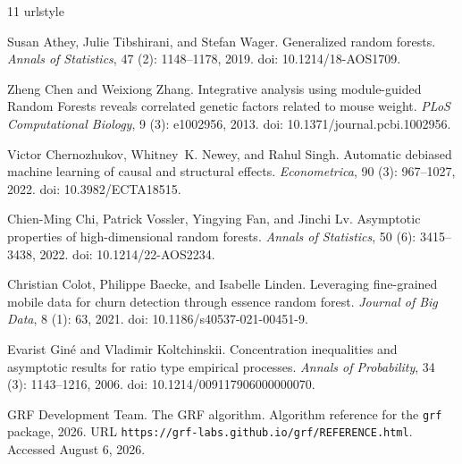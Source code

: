 \documentclass[12pt]{article}
\begin{document}
\begingroup
\small

\begin{thebibliography}{11}
\providecommand{\natexlab}[1]{#1}
\providecommand{\url}[1]{\texttt{#1}}
\expandafter\ifx\csname urlstyle\endcsname\relax
  \providecommand{\doi}[1]{doi: #1}\else
  \providecommand{\doi}{doi: \begingroup \urlstyle{rm}\Url}\fi

Susan Athey, Julie Tibshirani, and Stefan Wager.
\newblock Generalized random forests.
\newblock \emph{Annals of Statistics}, 47 (2): 1148--1178, 2019.
\newblock \doi{10.1214/18-AOS1709}.

Zheng Chen and Weixiong Zhang.
\newblock Integrative analysis using module-guided {Random Forests} reveals correlated genetic factors related to mouse weight.
\newblock \emph{PLoS Computational Biology}, 9 (3): e1002956, 2013.
\newblock \doi{10.1371/journal.pcbi.1002956}.

Victor Chernozhukov, Whitney~K. Newey, and Rahul Singh.
\newblock Automatic debiased machine learning of causal and structural effects.
\newblock \emph{Econometrica}, 90 (3): 967--1027, 2022.
\newblock \doi{10.3982/ECTA18515}.

Chien-Ming Chi, Patrick Vossler, Yingying Fan, and Jinchi Lv.
\newblock Asymptotic properties of high-dimensional random forests.
\newblock \emph{Annals of Statistics}, 50 (6): 3415--3438, 2022.
\newblock \doi{10.1214/22-AOS2234}.

Christian Colot, Philippe Baecke, and Isabelle Linden.
\newblock Leveraging fine-grained mobile data for churn detection through essence random forest.
\newblock \emph{Journal of Big Data}, 8 (1): 63, 2021.
\newblock \doi{10.1186/s40537-021-00451-9}.

Evarist Gin\'e and Vladimir Koltchinskii.
\newblock Concentration inequalities and asymptotic results for ratio type empirical processes.
\newblock \emph{Annals of Probability}, 34 (3): 1143--1216, 2006.
\newblock \doi{10.1214/009117906000000070}.

{GRF Development Team}.
\newblock The {GRF} algorithm.
\newblock Algorithm reference for the \texttt{grf} package, 2026.
\newblock URL \url{https://grf-labs.github.io/grf/REFERENCE.html}.
\newblock Accessed August 6, 2026.


\end{thebibliography}
\end{document}
